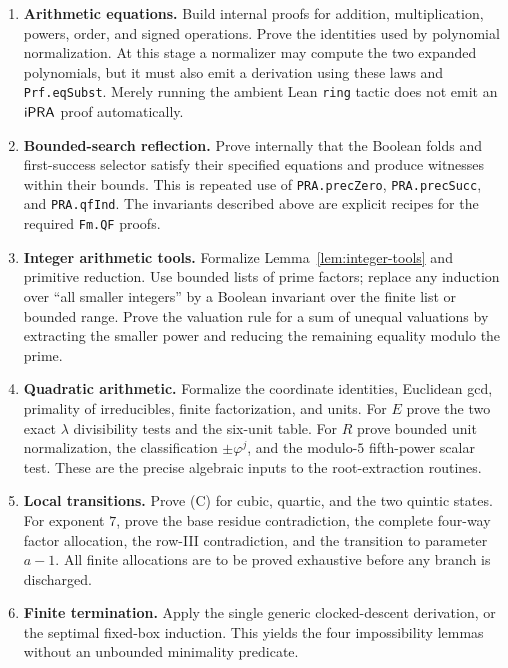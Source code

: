 \begin{enumerate}
\item \textbf{Arithmetic equations.} Build internal proofs for addition,
multiplication, powers, order, and signed operations. Prove the identities
used by polynomial normalization. At this stage a normalizer may compute
the two expanded polynomials, but it must also emit a derivation using
these laws and \texttt{Prf.eqSubst}. Merely running the ambient Lean
\texttt{ring} tactic does not emit an $\mathsf{iPRA}$ proof automatically.

\item \textbf{Bounded-search reflection.} Prove internally that the Boolean
folds and first-success selector satisfy their specified equations and
produce witnesses within their bounds. This is repeated use of
\texttt{PRA.precZero}, \texttt{PRA.precSucc}, and \texttt{PRA.qfInd}.
The invariants described above are explicit recipes for the required
\texttt{Fm.QF} proofs.

\item \textbf{Integer arithmetic tools.} Formalize
Lemma~\ref{lem:integer-tools} and primitive reduction. Use bounded lists
of prime factors; replace any induction over ``all smaller integers''
by a Boolean invariant over the finite list or bounded range. Prove the
valuation rule for a sum of unequal valuations by extracting the smaller
power and reducing the remaining equality modulo the prime.

\item \textbf{Quadratic arithmetic.} Formalize the coordinate identities,
Euclidean gcd, primality of irreducibles, finite factorization, and units.
For $E$ prove the two exact $\lambda$ divisibility tests and the six-unit
table. For $R$ prove bounded unit normalization, the classification
$\pm\varphi^j$, and the modulo-$5$ fifth-power scalar test. These are
the precise algebraic inputs to the root-extraction routines.

\item \textbf{Local transitions.} Prove (C) for cubic, quartic, and the two
quintic states. For exponent $7$, prove the base residue contradiction,
the complete four-way factor allocation, the row-III contradiction, and
the transition to parameter $a-1$. All finite allocations are to be
proved exhaustive before any branch is discharged.

\item \textbf{Finite termination.} Apply the single generic clocked-descent
derivation, or the septimal fixed-box induction. This yields the four
impossibility lemmas without an unbounded minimality predicate.


\end{enumerate}
